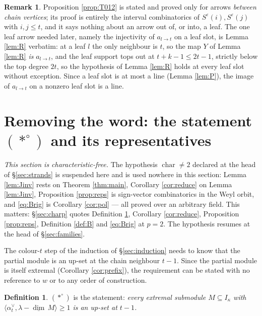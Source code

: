 \documentclass[reqno]{amsart}
\theoremstyle{plain}
\theoremstyle{definition}
\newtheorem{definition}[theorem]{Definition}
\newtheorem{remark}[theorem]{Remark}
\newcommand{\dimv}{\underline{\dim}\,}
\newcommand{\la}{\lambda}
\newcommand{\al}{\alpha}
\newcommand{\ka}{\kappa}
\newcommand{\eps}{\varepsilon}
\begin{document}
\begin{remark}
Proposition \ref{prop:T012} is stated and proved only for arrows \emph{between
chain vertices}; its proof is entirely the interval combinatorics of
$S^{\eps}(i),S^{\eps}(j)$ with $i,j\le t$, and it says nothing about an arrow
out of, or into, a leaf.  The one leaf arrow needed later, namely the
injectivity of $a_{l\to t}$ on a leaf slot, is Lemma \ref{lem:R} verbatim: at a
leaf $l$ the only neighbour is $t$, so the map $Y$ of Lemma \ref{lem:R}
\emph{is} $a_{l\to t}$, and the leaf support tops out at $t+k-1\le 2t-1$,
strictly below the top degree $2t$, so the hypothesis of Lemma \ref{lem:R} holds
at every leaf slot without exception.  Since a leaf slot is at most a line
(Lemma \ref{lem:P}), the image of $a_{l\to t}$ on a nonzero leaf slot is
a line.
\end{remark}

\section{Removing the word: the statement \texorpdfstring{$(*^\circ)$}{(*o)}
and its representatives}\label{sec:reps}

\emph{This section is characteristic-free.}  The hypothesis
$\operatorname{char}\ne2$ declared at the head of \S\ref{sec:strands} is
suspended here and is used nowhere in this section: Lemma \ref{lem:Jinv} rests
on Theorem \ref{thm:main}, Corollary \ref{cor:reduce} on Lemma \ref{lem:Jinv},
Proposition \ref{prop:reps} is sign-vector combinatorics in the Weyl orbit, and
\eqref{eq:Brig} is Corollary \ref{cor:pol} --- all proved over an arbitrary
field.  This matters: \S\ref{sec:charp} quotes Definition \ref{def:star},
Corollary \ref{cor:reduce}, Proposition \ref{prop:reps}, Definition
\ref{def:B} and \eqref{eq:Brig} at $p=2$.  The hypothesis resumes at the head
of \S\ref{sec:families}.

The colour-$t$ step of the induction of \S\ref{sec:induction} needs to know
that the partial module is an up-set at the chain neighbour $t-1$.  Since the
partial module is itself extremal (Corollary \ref{cor:prefix}), the requirement
can be stated with no reference to $w$ or to any order of construction.

\begin{definition}\label{def:star}
$(*^\circ)$ is the statement: \emph{every extremal submodule $M\subseteq I_\ka$
with $\langle\al_t^\vee,\la-\dimv M\rangle\ge1$ is an up-set at $t-1$.}
\end{definition}
\end{document}
